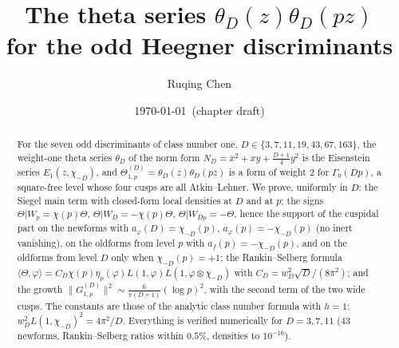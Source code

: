 \documentclass[11pt]{amsart}
\title[Theta series of the odd Heegner discriminants]{The theta series $\theta_D(z)\theta_D(pz)$\\ for the odd Heegner discriminants}
\author{Ruqing Chen}
\date{\today\ (chapter draft)}
\theoremstyle{remark}
\begin{document}
\begin{abstract}
For the seven odd discriminants of class number one, $D\in\{3,7,11,19,43,67,163\}$, the weight-one theta series $\theta_D$ of the norm form $N_D=x^2+xy+\frac{D+1}4y^2$ is the Eisenstein series $E_1(z,\chi_{-D})$, and $\Theta^{(D)}_{1,p}=\theta_D(z)\theta_D(pz)$ is a form of weight $2$ for $\Gamma_0(Dp)$, a square-free level whose four cusps are all Atkin--Lehner. We prove, uniformly in $D$: the Siegel main term with closed-form local densities at $D$ and at $p$; the signs $\Theta|W_p=\chi(p)\Theta$, $\Theta|W_D=-\chi(p)\Theta$, $\Theta|W_{Dp}=-\Theta$, hence the support of the cuspidal part on the newforms with $a_\varphi(D)=\chi_{-D}(p)$, $a_\varphi(p)=-\chi_{-D}(p)$ (no inert vanishing), on the oldforms from level $p$ with $a_f(p)=-\chi_{-D}(p)$, and on the oldforms from level $D$ only when $\chi_{-D}(p)=+1$; the Rankin--Selberg formula $\langle\Theta,\varphi\rangle=C_D\chi(p)\eta_p(\varphi)L(1,\varphi)L(1,\varphi\otimes\chi_{-D})$ with $C_D=w_D^2\sqrt D/(8\pi^2)$; and the growth $\|G^{(D)}_{1,p}\|^2\sim\frac6{\pi(D+1)}(\log p)^2$, with the second term of the two wide cusps. The constants are those of the analytic class number formula with $h=1$: $w_D^2L(1,\chi_{-D})^2=4\pi^2/D$. Everything is verified numerically for $D=3,7,11$ ($43$ newforms, Rankin--Selberg ratios within $0.5\%$, densities to $10^{-16}$).
\end{abstract}
\maketitle
\end{document}
